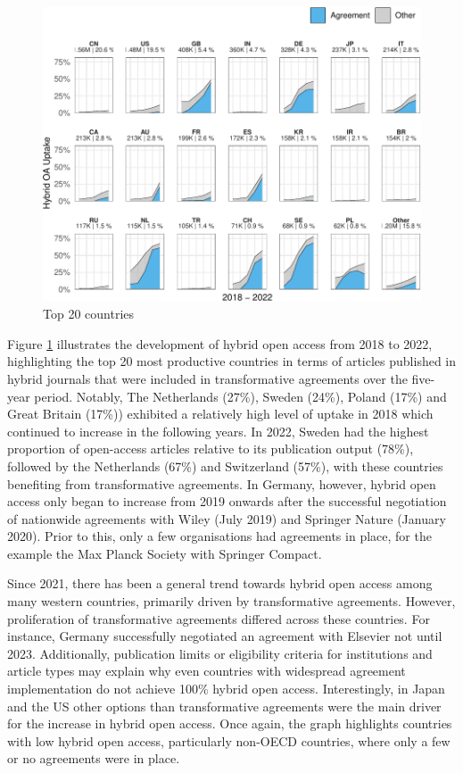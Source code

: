 \documentclass[a4paper,man,floatsintext,longtable,noextraspace,12pt]{apa6}
\begin{document}
\begin{figure}[ht!]

{\centering \includegraphics[width=0.99\linewidth,]{fig/country_top_20_plot-1} 

}

\caption{Top 20 countries}\label{fig:country_top_20_plot}
\end{figure}

Figure \ref{fig:country_top_20_plot} illustrates the development of
hybrid open access from 2018 to 2022, highlighting the top 20 most
productive countries in terms of articles published in hybrid journals
that were included in transformative agreements over the five-year
period. Notably, The Netherlands (27\%), Sweden (24\%), Poland (17\%)
and Great Britain (17\%)) exhibited a relatively high level of uptake in
2018 which continued to increase in the following years. In 2022, Sweden
had the highest proportion of open-access articles relative to its
publication output (78\%), followed by the Netherlands (67\%) and
Switzerland (57\%), with these countries benefiting from transformative
agreements. In Germany, however, hybrid open access only began to
increase from 2019 onwards after the successful negotiation of
nationwide agreements with Wiley (July 2019) and Springer Nature
(January 2020). Prior to this, only a few organisations had agreements
in place, for the example the Max Planck Society with Springer Compact.

Since 2021, there has been a general trend towards hybrid open access
among many western countries, primarily driven by transformative
agreements. However, proliferation of transformative agreements differed
across these countries. For instance, Germany successfully negotiated an
agreement with Elsevier not until 2023. Additionally, publication limits
or eligibility criteria for institutions and article types may explain
why even countries with widespread agreement implementation do not
achieve 100\% hybrid open access. Interestingly, in Japan and the US
other options than transformative agreements were the main driver for
the increase in hybrid open access. Once again, the graph highlights
countries with low hybrid open access, particularly non-OECD countries,
where only a few or no agreements were in place.
\end{document}
